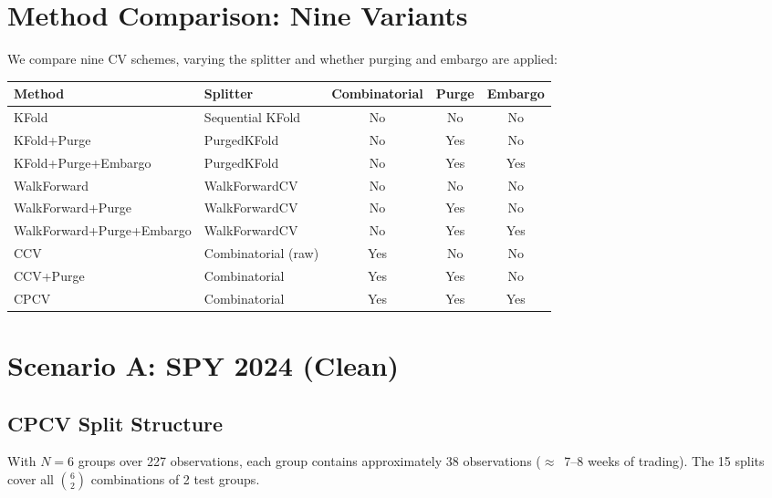 \documentclass[11pt,a4paper]{article}
\begin{document}
\section{Method Comparison: Nine Variants}

We compare nine CV schemes, varying the splitter and whether purging and
embargo are applied:

\begin{center}
\begin{tabular}{llccc}
\toprule
Method & Splitter & Combinatorial & Purge & Embargo \\
\midrule
KFold                    & Sequential KFold     & No  & No  & No  \\
KFold+Purge              & PurgedKFold          & No  & Yes & No  \\
KFold+Purge+Embargo      & PurgedKFold          & No  & Yes & Yes \\
WalkForward              & WalkForwardCV        & No  & No  & No  \\
WalkForward+Purge        & WalkForwardCV        & No  & Yes & No  \\
WalkForward+Purge+Embargo& WalkForwardCV        & No  & Yes & Yes \\
CCV                      & Combinatorial (raw)  & Yes & No  & No  \\
CCV+Purge                & Combinatorial        & Yes & Yes & No  \\
CPCV                     & Combinatorial        & Yes & Yes & Yes \\
\bottomrule
\end{tabular}
\end{center}

\section{Scenario A: SPY 2024 (Clean)}

\subsection{CPCV Split Structure}

With $N=6$ groups over 227 observations, each group contains approximately
38 observations ($\approx$~7--8 weeks of trading).  The 15 splits cover
all $\binom{6}{2}$ combinations of 2 test groups.
\end{document}
